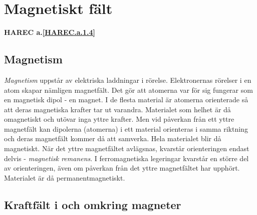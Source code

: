 \section{Magnetiskt fält}
\textbf{HAREC a.\ref{HAREC.a.1.4}\label{myHAREC.a.1.4}}
\label{elektromagnetiskafält}

\subsection{Magnetism}


\emph{Magnetism} uppstår av elektriska laddningar i rörelse. Elektronernas rörelser i
en atom skapar nämligen magnetfält. Det gör att atomerna var för sig fungerar
som en magnetisk dipol - en magnet. I de flesta material är atomerna
orienterade så att deras magnetiska krafter tar ut varandra. Materialet som
helhet är då omagnetiskt och utövar inga yttre krafter. Men vid påverkan från
ett yttre magnetfält kan dipolerna (atomerna) i ett material orienteras i samma
riktning och deras magnetfält kommer då att samverka. Hela materialet blir då
magnetiskt. När det yttre magnetfältet avlägsnas, kvarstår orienteringen endast
delvis - \emph{magnetisk remanens}. I ferromagnetiska legeringar kvarstår en
större del av orienteringen, även om påverkan från det yttre magnetfältet har
upphört. Materialet är då permanentmagnetiskt.

\subsection{Kraftfält i och omkring magneter}

